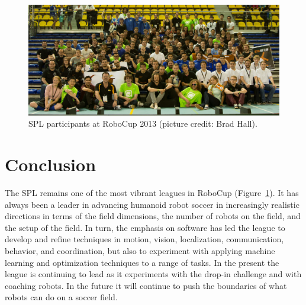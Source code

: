 \documentclass{llncs}
\begin{document}

\begin{figure}[t]
\centerline{
\includegraphics[width=\columnwidth]{"spl2013people"}
}
  \caption{SPL participants at RoboCup 2013 (picture credit: Brad Hall).}
  \label{spl2013people}
\end{figure} 

\section{Conclusion}

The SPL remains one of the most vibrant leagues in RoboCup (Figure~\ref{spl2013people}). It has always been a leader in
advancing humanoid robot soccer in increasingly realistic directions in terms of the field dimensions, the
number of robots on the field, and the setup of the field. In turn, the emphasis on software has
led the league to develop
and refine techniques in motion, vision, localization, communication, behavior, and coordination, but also to experiment with applying machine learning and optimization techniques to a range of tasks. In the present the league is
continuing to lead as it experiments with the drop-in challenge and with coaching robots. In the future
it will continue to push the boundaries of what robots can do on a soccer field.


 
\end{document}
